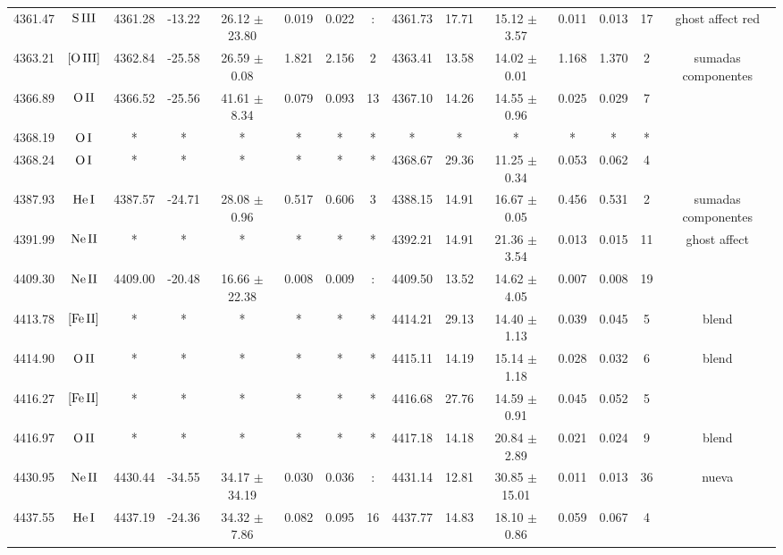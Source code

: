 \documentclass{article}
\begin{document}
\begin{table*}
\begin{adjustbox}{width=\textwidth}
\begin{tabular}{ccccccccccccccc}
4361.47 & $\mbox{S}\thinspace \mbox{III}$ & 4361.28 & -13.22 & 26.12 $\pm$ 23.80 & 0.019 & 0.022 & : & 4361.73 & 17.71 & 15.12 $\pm$ 3.57 & 0.011 & 0.013 & 17 &  ghost affect red \\
4363.21 & $\mbox{[O}\thinspace \mbox{III]}$ & 4362.84 & -25.58 & 26.59 $\pm$ 0.08 & 1.821 & 2.156 & 2 & 4363.41 & 13.58 & 14.02 $\pm$ 0.01 & 1.168 & 1.370 & 2 &  sumadas componentes \\
4366.89 & $\mbox{O}\thinspace \mbox{II}$ & 4366.52 & -25.56 & 41.61 $\pm$ 8.34 & 0.079 & 0.093 & 13 & 4367.10 & 14.26 & 14.55 $\pm$ 0.96 & 0.025 & 0.029 & 7 &  \\
4368.19 & $\mbox{O}\thinspace \mbox{I}$ & * & * & * & * & * & * & * & * & * & * & * & * &  \\
4368.24 & $\mbox{O}\thinspace \mbox{I}$ & * & * & * & * & * & * & 4368.67 & 29.36 & 11.25 $\pm$ 0.34 & 0.053 & 0.062 & 4 &  \\
4387.93 & $\mbox{He}\thinspace \mbox{I}$ & 4387.57 & -24.71 & 28.08 $\pm$ 0.96 & 0.517 & 0.606 & 3 & 4388.15 & 14.91 & 16.67 $\pm$ 0.05 & 0.456 & 0.531 & 2 &  sumadas componentes \\
4391.99 & $\mbox{Ne}\thinspace \mbox{II}$ & * & * & * & * & * & * & 4392.21 & 14.91 & 21.36 $\pm$ 3.54 & 0.013 & 0.015 & 11 &  ghost affect \\
4409.30 & $\mbox{Ne}\thinspace \mbox{II}$ & 4409.00 & -20.48 & 16.66 $\pm$ 22.38 & 0.008 & 0.009 & : & 4409.50 & 13.52 & 14.62 $\pm$ 4.05 & 0.007 & 0.008 & 19 &  \\
4413.78 & $\mbox{[Fe}\thinspace \mbox{II]}$ & * & * & * & * & * & * & 4414.21 & 29.13 & 14.40 $\pm$ 1.13 & 0.039 & 0.045 & 5 &  blend \\
4414.90 & $\mbox{O}\thinspace \mbox{II}$ & * & * & * & * & * & * & 4415.11 & 14.19 & 15.14 $\pm$ 1.18 & 0.028 & 0.032 & 6 &  blend \\
4416.27 & $\mbox{[Fe}\thinspace \mbox{II]}$ & * & * & * & * & * & * & 4416.68 & 27.76 & 14.59 $\pm$ 0.91 & 0.045 & 0.052 & 5 &  \\
4416.97 & $\mbox{O}\thinspace \mbox{II}$ & * & * & * & * & * & * & 4417.18 & 14.18 & 20.84 $\pm$ 2.89 & 0.021 & 0.024 & 9 &  blend \\
4430.95 & $\mbox{Ne}\thinspace \mbox{II}$ & 4430.44 & -34.55 & 34.17 $\pm$ 34.19 & 0.030 & 0.036 & : & 4431.14 & 12.81 & 30.85 $\pm$ 15.01 & 0.011 & 0.013 & 36 &  nueva \\
4437.55 & $\mbox{He}\thinspace \mbox{I}$ & 4437.19 & -24.36 & 34.32 $\pm$ 7.86 & 0.082 & 0.095 & 16 & 4437.77 & 14.83 & 18.10 $\pm$ 0.86 & 0.059 & 0.067 & 4 &  \\

\end{tabular}
\end{adjustbox}
\end{table*}
\end{document}
